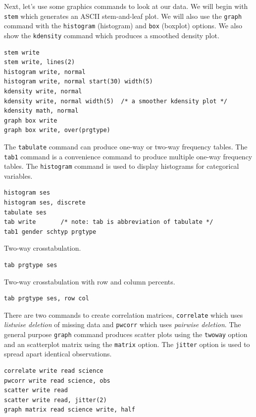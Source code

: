\documentclass{article}
\begin{document}
Next, let's use some graphics commands to look at our data. We will begin with \lstinline{stem} which generates an ASCII stem-and-leaf plot. We will also use the \lstinline{graph} command with the \lstinline{histogram} (histogram) and \lstinline{box} (boxplot) options. We also show the \lstinline{kdensity} command which produces a smoothed density plot.

\begin{lstlisting}
stem write
stem write, lines(2)
histogram write, normal
histogram write, normal start(30) width(5)
kdensity write, normal
kdensity write, normal width(5)  /* a smoother kdensity plot */
kdensity math, normal
graph box write
graph box write, over(prgtype)
\end{lstlisting}


The \lstinline{tabulate} command can produce one-way or two-way frequency tables. The \lstinline{tab1} command is a convenience command to produce multiple one-way frequency tables. The \lstinline{histogram} command is used to display histograms for categorical variables.

\begin{lstlisting}
histogram ses
histogram ses, discrete
tabulate ses
tab write       /* note: tab is abbreviation of tabulate */
tab1 gender schtyp prgtype
\end{lstlisting}

Two-way crosstabulation.
\begin{lstlisting}
tab prgtype ses
\end{lstlisting}

Two-way crosstabulation with row and column percents.
\begin{lstlisting}
tab prgtype ses, row col
\end{lstlisting}

There are two commands to create correlation matrices, \lstinline{correlate} which uses \textit{listwise deletion} of missing data and \lstinline{pwcorr} which uses \textit{pairwise deletion}. The general purpose \lstinline{graph} command produces scatter plots using the \lstinline{twoway} option and an scatterplot matrix using the \lstinline{matrix} option. The \lstinline{jitter} option is used to spread apart identical observations.

\begin{lstlisting}
correlate write read science
pwcorr write read science, obs
scatter write read
scatter write read, jitter(2)
graph matrix read science write, half
\end{lstlisting}
\end{document}

